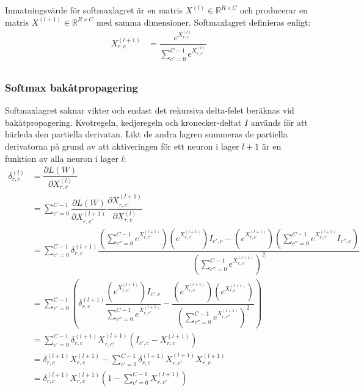 \documentclass[a4paper,11pt,twoside]{article}
\newcommand*{\pd}[2]{\ensuremath{\dfrac{\partial #1}{\partial #2}}}
\begin{document}
Inmatningsvärde för softmaxlagret är en matris $X^{(l)} \in \mathbb{R}^{R \times C}$ och producerar en matris $X^{(l+1)} \in \mathbb{R}^{R \times C}$ med samma dimensioner. Softmaxlagret definieras enligt:
\begin{equation}
\begin{split}
X^{(l+1)}_{r,c}
	& = \dfrac{e^{X^{(l)}_{r,c}}}{\sum^{C-1}_{c'=0}e^{X^{(l)}_{r,c'}}} \\
\end{split}
\end{equation}

\subsubsection{Softmax bakåtpropagering}

Softmaxlagret saknar vikter och endast det rekursiva delta-felet beräknas vid bakåtpropagering. Kvotregeln, kedjeregeln och kronecker-deltat $I$ används för att härleda den partiella derivatan. Likt de andra lagren summeras de partiella derivatorna på grund av att aktiveringen för ett neuron i lager $l+1$ är en funktion av alla neuron i lager $l$: \cite{cs231n} \cite{notesonbackprop} \cite{websoftmax} 
\begin{equation}
\begin{split}
\delta^{(l)}_{r,c}
		& = \pd{L(W)}{X^{(l)}_{r,c}} \\
		& = \sum^{C-1}_{c'=0} \pd{L(W)}{X^{(l+1)}_{r,c'}} \pd{X^{(l+1)}_{r,c'}}{X^{(l)}_{r,c}} \\
		& = \sum^{C-1}_{c'=0} \delta^{(l+1)}_{r,c} \dfrac{(\sum^{C-1}_{c''=0}e^{X^{(l+1)}_{r,c''}}) (e^{X^{(l+1)}_{r,c'}})I_{c',c} - (e^{X^{(l+1)}_{r,c'}})(\sum^{C-1}_{c''=0}e^{X^{(l+1)}_{r,c''}} I_{c'',c})}{(\sum^{C-1}_{c''=0}e^{X^{(l+1)}_{r,c''}})^2} \\
		& = \sum^{C-1}_{c'=0} \left( \delta^{(l+1)}_{r,c} \dfrac{(e^{X^{(l+1)}_{r,c'}})I_{c',c}}{\sum^{C-1}_{c''=0}e^{X^{(l+1)}_{r,c''}}} - \dfrac{(e^{X^{(l+1)}_{r,c'}})(e^{X^{(l+1)}_{r,c}})}{(\sum^{C-1}_{c''=0}e^{X^{(l+1)}_{r,c''}})^2} \right) \\
		& = \sum^{C-1}_{c'=0}  \delta^{(l+1)}_{r,c} X^{(l+1)}_{r,c'}(I_{c',c}-X^{(l+1)}_{r,c}) \\
		& = \delta^{(l+1)}_{r,c} X^{(l+1)}_{r,c} - \sum^{C-1}_{c'=0}  \delta^{(l+1)}_{r,c} X^{(l+1)}_{r,c'}X^{(l+1)}_{r,c} \\
		& = \delta^{(l+1)}_{r,c} X^{(l+1)}_{r,c} \left( 1-\sum^{C-1}_{c'=0} X^{(l+1)}_{r,c'} \right)
\end{split}
\end{equation}
\end{document}
